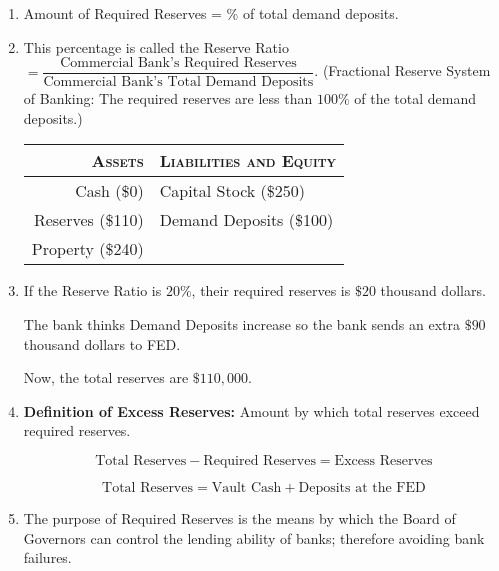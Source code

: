 \begin{enumerate}[label = \textbf{(\arabic*)}]
		\begin{enumerate}[label = (\alph*)]
			\item Amount of Required Reserves = \% of total demand deposits.

			\item This percentage is called the Reserve Ratio $= \dfrac{\text{Commercial Bank's Required Reserves}}{\text{Commercial Bank's Total Demand Deposits}}$.
				(Fractional Reserve System of Banking: The required reserves are less than $100\%$ of the total demand deposits.)

		\begin{center}
			\vspace{1em}
			\begin{tabular}{r|l}\toprule
				\textsc{Assets}			& \textsc{Liabilities and Equity}	\\ \midrule
				Cash (\$0)				& Capital Stock (\$250)				\\ 
				Reserves (\$110)		& Demand Deposits (\$100)			\\ 
				Property (\$240)		& 									\\ \bottomrule
			\end{tabular}
			\vspace{1em}
		\end{center}

			\item If the Reserve Ratio is $20\%$, their required reserves is $\$20$ thousand dollars.

				The bank thinks Demand Deposits increase so the bank sends an extra $\$90$ thousand dollars to FED.

				Now, the total reserves are $\$110,000$.
	
			\item[\textbullet] \textbf{Definition of Excess Reserves:} Amount by which total reserves exceed required reserves.
				
				\[
					\text{Total Reserves} - \text{Required Reserves} = \text{Excess Reserves}
				\]

				\[
					\text{Total Reserves} = \text{Vault Cash} + \text{Deposits at the FED}
				\]

			\item[\textbullet] The purpose of Required Reserves is the means by which the Board of Governors can control the lending ability of banks; therefore avoiding bank failures.


\end{enumerate}
\end{enumerate}
